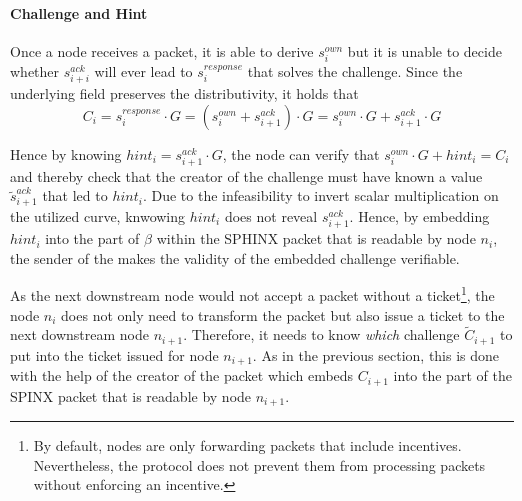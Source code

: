 \paragraph{Challenge and Hint}
\label{sec:proofofrelay:challenge}

Once a node receives a packet, it is able to derive $s_i^{own}$ but it is unable to decide whether $s_{i+i}^{ack}$ will ever lead to $s_i^{response}$ that solves the challenge. Since the underlying field preserves the distributivity, it holds that $$C_i = s_i^{response} \cdot G = (s_i^{own} + s_{i+1}^{ack}) \cdot G = s_i^{own} \cdot G + s_{i+1}^{ack} \cdot G$$

Hence by knowing $hint_i = s_{i+1}^{ack} \cdot G$, the node can verify that $s_i^{own} \cdot G + hint_i = C_i$ and thereby check that the creator of the challenge must have known a value $\tilde{s}_{i+1}^{ack}$ that led to $hint_i$. Due to the infeasibility to invert scalar multiplication on the utilized curve, knwowing $hint_i$ does not reveal $s_{i+1}^{ack}$. Hence, by embedding $hint_i$ into the part of $\beta$ within the SPHINX packet that is readable by node $n_i$, the sender of the makes the validity of the embedded challenge verifiable.

As the next downstream node would not accept a packet without a ticket\footnote{By default, nodes are only forwarding packets that include incentives. Nevertheless, the protocol does not prevent them from processing packets without enforcing an incentive.}, the node $n_i$ does not only need to transform the packet but also issue a ticket to the next downstream node $n_{i+1}$. Therefore, it needs to know \textit{which} challenge $\tilde{C}_{i+1}$ to put into the ticket issued for node $n_{i+1}$. As in the previous section, this is done with the help of the creator of the packet which embeds $C_{i+1}$ into the part of the SPINX packet that is readable by node $n_{i+1}$.

